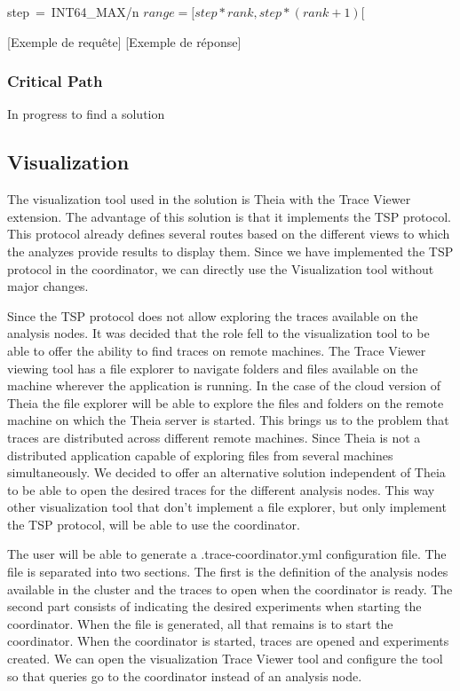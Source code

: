 \hbox{step = INT64\_MAX/n}
$ range = [step * rank, step * (rank + 1)[$ 


[Exemple de requête]
[Exemple de réponse]
\subsubsection{Critical Path}

In progress to find a solution

\subsection{Visualization}

The visualization tool used in the solution is Theia with the Trace Viewer extension. The advantage of this solution is that it implements the TSP protocol. This protocol already defines several routes based on the different views to which the analyzes provide results to display them. Since we have implemented the TSP protocol in the coordinator, we can directly use the Visualization tool without major changes.

Since the TSP protocol does not allow exploring the traces available on the analysis nodes. It was decided that the role fell to the visualization tool to be able to offer the ability to find traces on remote machines. The Trace Viewer viewing tool has a file explorer to navigate folders and files available on the machine wherever the application is running. In the case of the cloud version of Theia the file explorer will be able to explore the files and folders on the remote machine on which the Theia server is started. This brings us to the problem that traces are distributed across different remote machines. Since Theia is not a distributed application capable of exploring files from several machines simultaneously. We decided to offer an alternative solution independent of Theia to be able to open the desired traces for the different analysis nodes. This way other visualization tool that don't implement a file explorer, but only implement the TSP protocol, will be able to use the coordinator.

The user will be able to generate a .trace-coordinator.yml configuration file. The file is separated into two sections. The first is the definition of the analysis nodes available in the cluster and the traces to open when the coordinator is ready. The second part consists of indicating the desired experiments when starting the coordinator. When the file is generated, all that remains is to start the coordinator. When the coordinator is started, traces are opened and experiments created. We can open the visualization Trace Viewer tool and configure the tool so that queries go to the coordinator instead of an analysis node.

